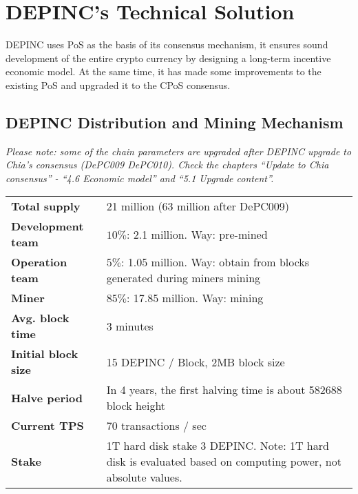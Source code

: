 \chapter{DEPINC's Technical Solution}
\begin{flushleft}
    DEPINC uses PoS as the basis of its consensus mechanism, it ensures sound development of the entire crypto currency by designing a long-term incentive economic model. At the same time, it has made some improvements to the existing PoS and upgraded it to the CPoS consensus.
\end{flushleft}
\section{DEPINC Distribution and Mining Mechanism}
\begin{flushleft}
    \textit{Please note: some of the chain parameters are upgraded after DEPINC upgrade to Chia's consensus (DePC009 DePC010). Check the chapters ``Update to Chia consensus'' - ``4.6 Economic model'' and ``5.1 Upgrade content''.}
\end{flushleft}
\begin{tabular}{ p{4cm} p{8cm} }
    \hline
    \textbf{Total supply}                           & 21 million (63 million after DePC009)                                                                       \\[5pt]
    \rowcolor{lightgray!30}\textbf{Development team}   & $10\%$: 2.1 million. Way: pre-mined                                                                      \\[5pt]
    \textbf{Operation team}                         & $5\%$: 1.05 million. Way: obtain from blocks generated during miners mining                              \\[5pt]
    \rowcolor{lightgray!30}\textbf{Miner}              & $85\%$: 17.85 million. Way: mining                                                                       \\[5pt]
    \textbf{Avg. block time}                        & 3 minutes                                                                                                \\[5pt]
    \rowcolor{lightgray!30}\textbf{Initial block size} & 15 DEPINC / Block, 2MB block size                                                                           \\[5pt]
    \textbf{Halve period}                           & In 4 years, the first halving time is about 582688 block height                                          \\[5pt]
    \rowcolor{lightgray!30}\textbf{Current TPS}        & 70 transactions / sec                                                                                    \\[5pt]
    \textbf{Stake}                                  & 1T hard disk stake 3 DEPINC. Note: 1T hard disk is evaluated based on computing power, not absolute values. \\[5pt]
    \hline
\end{tabular}
